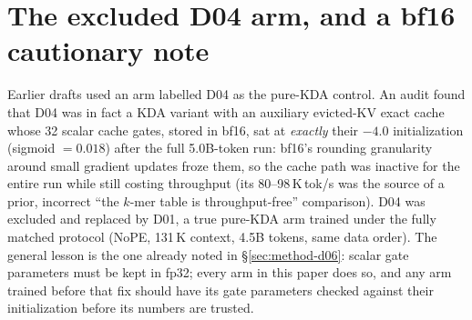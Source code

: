 \documentclass[11pt]{article}
\theoremstyle{plain}
\begin{document}
\section{The excluded D04 arm, and a bf16 cautionary note}\label{sec:d04}

Earlier drafts used an arm labelled D04 as the pure-KDA control. An audit found that D04 was in
fact a KDA variant with an auxiliary evicted-KV exact cache whose 32 scalar cache gates, stored
in bf16, sat at \emph{exactly} their $-4.0$ initialization (sigmoid $= 0.018$) after the full
5.0B-token run: bf16's rounding granularity around small gradient updates froze them, so the
cache path was inactive for the entire run while still costing throughput (its 80--98\,K\,tok/s
was the source of a prior, incorrect ``the $k$-mer table is throughput-free'' comparison).
D04 was excluded and replaced by D01, a true pure-KDA arm trained under the fully matched
protocol (NoPE, 131\,K context, 4.5B tokens, same data order). The general lesson is the one
already noted in \S\ref{sec:method-d06}: scalar gate parameters must be kept in fp32; every arm
in this paper does so, and any arm trained before that fix should have its gate parameters
checked against their initialization before its numbers are trusted.



\end{document}
